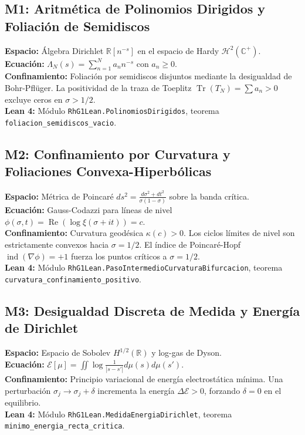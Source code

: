 \documentclass[11pt,a4paper]{article}
\begin{document}
\subsection{M1: Aritmética de Polinomios Dirigidos y Foliación de Semidiscos}
\textbf{Espacio:} Álgebra Dirichlet $\mathbb{R}[n^{-s}]$ en el espacio de Hardy $\mathcal{H}^2(\mathbb{C}^+)$.\\
\textbf{Ecuación:} $\Lambda_N(s) = \sum_{n=1}^N a_n n^{-s}$ con $a_n \ge 0$.\\
\textbf{Confinamiento:} Foliación por semidiscos disjuntos mediante la desigualdad de Bohr-Pflüger. La positividad de la traza de Toeplitz $\operatorname{Tr}(T_N) = \sum a_n > 0$ excluye ceros en $\sigma > 1/2$.\\
\textbf{Lean 4:} Módulo \texttt{RhG1Lean.PolinomiosDirigidos}, teorema \texttt{foliacion\_semidiscos\_vacio}.

\subsection{M2: Confinamiento por Curvatura y Foliaciones Convexa-Hiperbólicas}
\textbf{Espacio:} Métrica de Poincaré $ds^2 = \frac{d\sigma^2 + dt^2}{\sigma(1-\sigma)}$ sobre la banda crítica.\\
\textbf{Ecuación:} Gauss-Codazzi para líneas de nivel $\phi(\sigma, t) = \operatorname{Re}(\log \xi(\sigma+it)) = c$.\\
\textbf{Confinamiento:} Curvatura geodésica $\kappa(c) > 0$. Los ciclos límites de nivel son estrictamente convexos hacia $\sigma = 1/2$. El índice de Poincaré-Hopf $\operatorname{ind}(\nabla \phi) = +1$ fuerza los puntos críticos a $\sigma = 1/2$.\\
\textbf{Lean 4:} Módulo \texttt{RhG1Lean.PasoIntermedioCurvaturaBifurcacion}, teorema \texttt{curvatura\_confinamiento\_positivo}.

\subsection{M3: Desigualdad Discreta de Medida y Energía de Dirichlet}
\textbf{Espacio:} Espacio de Sobolev $H^{1/2}(\mathbb{R})$ y log-gas de Dyson.\\
\textbf{Ecuación:} $\mathcal{E}[\mu] = \iint \log\frac{1}{|s - s'|} d\mu(s) d\mu(s')$.\\
\textbf{Confinamiento:} Principio variacional de energía electrostática mínima. Una perturbación $\sigma_j \to \sigma_j + \delta$ incrementa la energía $\Delta \mathcal{E} > 0$, forzando $\delta = 0$ en el equilibrio.\\
\textbf{Lean 4:} Módulo \texttt{RhG1Lean.MedidaEnergiaDirichlet}, teorema \texttt{minimo\_energia\_recta\_critica}.
\end{document}
